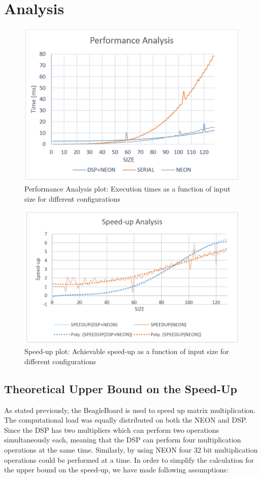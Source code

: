 
\section{Analysis}

\begin{figure}[h!]
\includegraphics[width=\textwidth]{analysis/perf_plot}
\caption{Performance Analysis plot: Execution times as a function of input size for different configurations}
\label{fig:perf_plot}
\end{figure}

\begin{figure}[h!]
\includegraphics[width=\textwidth]{analysis/speedup_plot}
\caption{Speed-up plot: Achievable speed-up as a function of input size for different configurations}
\label{fig:speedup_plot}
\end{figure}

\subsection{Theoretical Upper Bound on the Speed-Up}
As stated previously, the BeagleBoard is used to speed up matrix multiplication. The computational load was equally distributed on both the NEON and DSP. Since the DSP has two multipliers which can perform two operations simultaneously each, meaning that the DSP can perform four multiplication operations at the same time. Similarly, by using NEON four 32 bit multiplication operations could be performed at a time. In order to simplify the calculation for the upper bound on the speed-up, we have made following assumptions:

